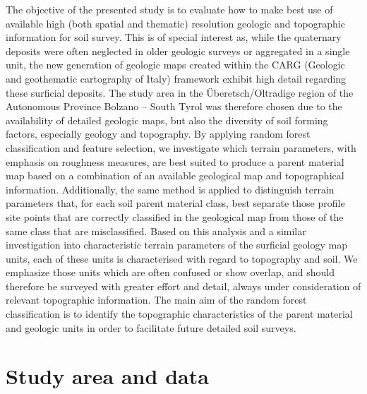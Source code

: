 \documentclass[preprint,12pt,authoryear]{elsarticle}
\begin{document}
The objective of the presented study is to evaluate how to make best use of available high (both spatial and thematic) resolution geologic and topographic information for soil survey. This is of special interest as, while the quaternary deposits were often neglected in older geologic surveys or aggregated in a single unit, the new generation of geologic maps created within the CARG (Geologic and geothematic cartography of Italy) framework  exhibit high detail regarding these surficial deposits.  The study area in the \"{U}beretsch/Oltradige region of the Autonomous Province Bolzano -- South Tyrol was therefore chosen due to the availability of detailed geologic maps, but also the diversity of soil forming factors, especially geology and topography. By applying random forest classification and feature selection, we investigate which terrain parameters, with emphasis on roughness measures, are best suited to produce a parent material map based on a combination of an available geological map and topographical information. Additionally, the same method is applied to distinguish terrain parameters that, for each soil parent material class, best separate those profile site points that are correctly classified in the geological map from those of the same class that are misclassified. Based on this analysis and a similar investigation into characteristic terrain parameters of the surficial geology map units, each of these units is characterised with regard to topography and soil. We emphasize those units which are often confused or show overlap, and should therefore be surveyed with greater effort and detail, always under consideration of relevant topographic information.
The main aim of the random forest classification is to identify the topographic characteristics of the parent material and geologic units in order to facilitate future detailed soil surveys.

\section{Study area and data}
\end{document}
